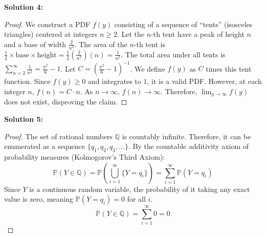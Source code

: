 \documentclass[11pt, a4paper]{article}
\theoremstyle{definition}
\theoremstyle{remark}
\newcommand{\Q}{\mathbb{Q}}
\newcommand{\Prob}{\mathbb{P}}
\begin{document}
\textbf{Solution 4:}
\begin{proof}
We construct a PDF $f(y)$ consisting of a sequence of ``tents'' (isosceles triangles) centered at integers $n \ge 2$. Let the $n$-th tent have a peak of height $n$ and a base of width $\frac{2}{n^3}$. 
The area of the $n$-th tent is $\frac{1}{2} \times \text{base} \times \text{height} = \frac{1}{2} \left(\frac{2}{n^3}\right)(n) = \frac{1}{n^2}$.
The total area under all tents is $\sum_{n=2}^\infty \frac{1}{n^2} = \frac{\pi^2}{6} - 1$. 
Let $C = \left(\frac{\pi^2}{6} - 1\right)^{-1}$. We define $f(y)$ as $C$ times this tent function. 
Since $f(y) \ge 0$ and integrates to $1$, it is a valid PDF. However, at each integer $n$, $f(n) = C \cdot n$. As $n \to \infty$, $f(n) \to \infty$. Therefore, $\lim_{y \to \infty} f(y)$ does not exist, disproving the claim.

\vspace{10pt}
\end{proof}

\textbf{Solution 5:}
\begin{proof}
The set of rational numbers $\Q$ is countably infinite. Therefore, it can be enumerated as a sequence $\{q_1, q_2, q_3, \dots\}$.
By the countable additivity axiom of probability measures (Kolmogorov's Third Axiom):
\[ \Prob(Y \in \Q) = \Prob\left(\bigcup_{i=1}^\infty \{Y = q_i\}\right) = \sum_{i=1}^\infty \Prob(Y = q_i) \]
Since $Y$ is a continuous random variable, the probability of it taking any exact value is zero, meaning $\Prob(Y = q_i) = 0$ for all $i$.
\[ \Prob(Y \in \Q) = \sum_{i=1}^\infty 0 = 0 \]
\end{proof}
\end{document}
